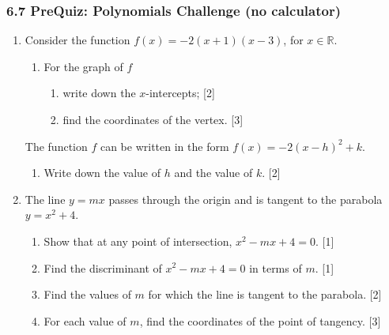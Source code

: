 \documentclass[12pt, twoside]{article}
\begin{document}
\subsubsection*{6.7 PreQuiz: Polynomials Challenge (no calculator)}

\begin{enumerate}[itemsep=0.15cm]

\item[1.] [Maximum mark: 7]

Consider the function $f(x) = -2(x + 1)(x - 3)$, for $x \in \mathbb{R}$.

\begin{enumerate}[itemsep=0.15cm]
  \item For the graph of $f$
  \begin{enumerate}[itemsep=0.1cm]
    \item[(i)] write down the $x$-intercepts; \hfill [2]
    \item[(ii)] find the coordinates of the vertex. \hfill [3]
  \end{enumerate}
\end{enumerate}

The function $f$ can be written in the form $f(x) = -2(x - h)^2 + k$.

\begin{enumerate}[itemsep=0.15cm]
  \item[(b)] Write down the value of $h$ and the value of $k$. \hfill [2]
\end{enumerate}


\newpage

\item[2.] [Maximum mark: 7]

The line $y = mx$ passes through the origin and is tangent
to the parabola $y = x^2 + 4$.

\begin{enumerate}[itemsep=0.15cm]
  \item Show that at any point of intersection,
  $x^2 - mx + 4 = 0$. \hfill [1]
  \item Find the discriminant of $x^2 - mx + 4 = 0$
  in terms of $m$. \hfill [1]
  \item Find the values of $m$ for which the line is tangent
  to the parabola. \hfill [2]
  \item For each value of $m$, find the coordinates of
  the point of tangency. \hfill [3]
\end{enumerate}


\end{enumerate}
\end{document}

